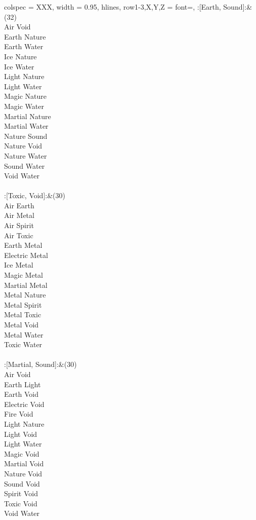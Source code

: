 \begin{longtblr}[
	caption = {2v2 Attacking Ineffective},
	label = {2v2-Attacking-Ineffective},
]{
	colspec = {XXX}, width = 0.95\linewidth,
	hlines,
	row{1-3,X,Y,Z} = {font=\bfseries},
}
	:[Earth, Sound]:&{(32)\\
	Air Void \\
	Earth Nature \\
	Earth Water \\
	Ice Nature \\
	Ice Water \\
	Light Nature \\
	Light Water \\
	Magic Nature \\
	Magic Water \\
	Martial Nature \\
	Martial Water \\
	Nature Sound \\
	Nature Void \\
	Nature Water \\
	Sound Water \\
	Void Water \\
	}\\

	:[Toxic, Void]:&{(30)\\
	Air Earth \\
	Air Metal \\
	Air Spirit \\
	Air Toxic \\
	Earth Metal \\
	Electric Metal \\
	Ice Metal \\
	Magic Metal \\
	Martial Metal \\
	Metal Nature \\
	Metal Spirit \\
	Metal Toxic \\
	Metal Void \\
	Metal Water \\
	Toxic Water \\
	}\\

	:[Martial, Sound]:&{(30)\\
	Air Void \\
	Earth Light \\
	Earth Void \\
	Electric Void \\
	Fire Void \\
	Light Nature \\
	Light Void \\
	Light Water \\
	Magic Void \\
	Martial Void \\
	Nature Void \\
	Sound Void \\
	Spirit Void \\
	Toxic Void \\
	Void Water \\
	}\\


\end{longtblr}
